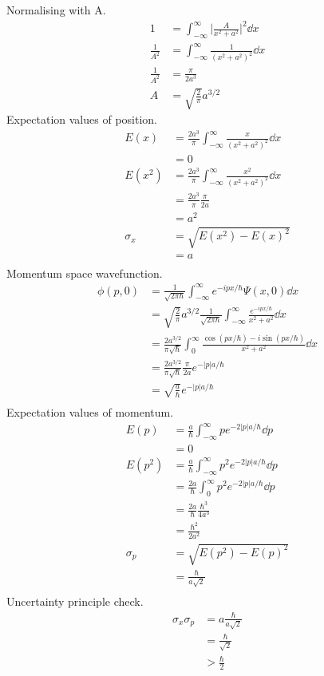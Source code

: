 \documentclass[newpage]{homework}
\begin{document}
\question
Normalising with A.
\begin{align*}
	1	&=	\int_{-\infty}^{\infty}	\Big| \frac{A}{x^2+a^2} \Big|^2	\dd{x}	\\
	\frac{1}{A^2}	&=	\int_{-\infty}^{\infty}	\frac{1}{(x^2+a^2)^2}	\dd{x}	\\
	\frac{1}{A^2}	&=	\frac{\pi}{2a^3}	\\
	A	&=	\boxed{\sqrt{\frac{2}{\pi}} a^{3/2}}
\end{align*}
Expectation values of position.
\begin{align*}
	E(x)	&=	\frac{2a^3}{\pi}	\int_{-\infty}^{\infty}	\frac{x}{(x^2+a^2)^2}	\dd{x}	\\
		&=	\boxed{0}	\\
	E(x^2)	&=	\frac{2a^3}{\pi}	\int_{-\infty}^{\infty}	\frac{x^2}{(x^2+a^2)^2}	\dd{x}	\\
		&=	\frac{2a^3}{\pi} \frac{\pi}{2a}	\\
		&=	\boxed{a^2}	\\
	\sigma_x	&=	\sqrt{E(x^2)-E(x)^2}	\\
		&=	\boxed{a}	\\
\end{align*}
Momentum space wavefunction.
\begin{align*}
	\phi(p,0)	&=	\frac{1}{\sqrt{2\pi\hbar}}  \int_{-\infty}^{\infty}	e^{-ipx/\hbar} \Psi(x,0)	\dd{x}	\\
	&=	\sqrt{\frac{2}{\pi}} a^{3/2} \frac{1}{\sqrt{2\pi\hbar}} \int_{-\infty}^{\infty}	\frac{e^{-ipx/\hbar}}{x^2+a^2}	\dd{x}	\\
	&=	\frac{2a^{3/2}}{\pi\sqrt{\hbar}}  \int_{0}^{\infty} \frac{\cos(px/\hbar)-i\sin(px/\hbar)}{x^2+a^2}	\dd{x}	\\
	&=	\frac{2a^{3/2}}{\pi\sqrt{\hbar}}  \frac{\pi}{2a} e^{-|p|a/\hbar}	\\
	&=	\boxed{\sqrt{\frac{a}{\hbar}} e^{-|p|a/\hbar}}	\\
\end{align*}
Expectation values of momentum.
\begin{align*}
	E(p)	&=	\frac{a}{\hbar} \int_{-\infty}^{\infty}	pe^{-2|p|a/\hbar}	\dd{p}	\\
		&=	\boxed{0}	\\
	E(p^2)	&=	\frac{a}{\hbar} \int_{-\infty}^{\infty}	p^2e^{-2|p|a/\hbar}	\dd{p}	\\
	&=	\frac{2a}{\hbar} \int_{0}^{\infty}	p^2e^{-2|p|a/\hbar}	\dd{p}	\\
	&=	\frac{2a}{\hbar} \frac{\hbar^3}{4a^3}	\\
	&=	\boxed{\frac{\hbar^2}{2a^2}}	\\
	\sigma_p	&=	\sqrt{E(p^2)-E(p)^2}	\\
		&=	\frac{\hbar}{a\sqrt{2}}	\\
\end{align*}
Uncertainty principle check.
\begin{align*}
	\sigma_x \sigma_p	&=	a\frac{\hbar}{a\sqrt{2}}	\\
		&=	\frac{\hbar}{\sqrt{2}}	\\
		&>	\frac{\hbar}{2}
\end{align*}
\end{document}
